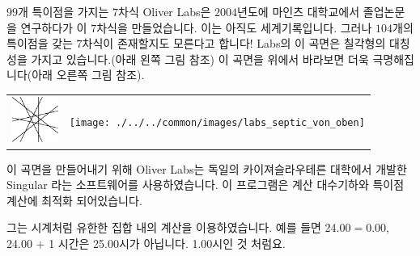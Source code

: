 \begin{surferPage}[99개의 특이점]{$99$개 특이점을 가지는 $7$차식}
    Oliver Labs은 $2004$년도에 마인츠 대학교에서 졸업논문을 연구하다가 이 $7$차식을 만들었습니다. 이는 아직도 세계기록입니다. 그러나 $104$개의 특이점을 갖는 $7$차식이 존재할지도 모른다고 합니다! Labs의 이 곡면은 칠각형의 대칭성을 가지고 있습니다.(아래 왼쪽 그림 참조) 이 곡면을 위에서 바라보면 더욱 극명해집니다(아래 오른쪽 그림 참조). 

    \vspace*{-0.3em}
    \begin{center}
      \begin{tabular}{c@{\qquad}c}
        \includegraphics[height=1.5cm]{./../../common/images/labsseptic1.pdf}
        &
        \texttt{[image: ./../../common/images/labs\_septic\_von\_oben]}
      \end{tabular}
    \end{center}
    \vspace*{-0.3em}

이 곡면을 만들어내기 위해 Oliver Labs는 독일의 카이져슬라우테른 대학에서 개발한 {\sc Singular} 라는 소프트웨어를 사용하였습니다. 이 프로그램은 계산 대수기하와 특이점 계산에 최적화 되어있습니다. 

그는 시계처럼 유한한 집합 내의 계산을 이용하였습니다. 예를 들면 24.00$=$0.00, 24.00 $+$ 1 시간은 25.00시가 아닙니다. 1.00시인 것 처럼요.
\end{surferPage}
